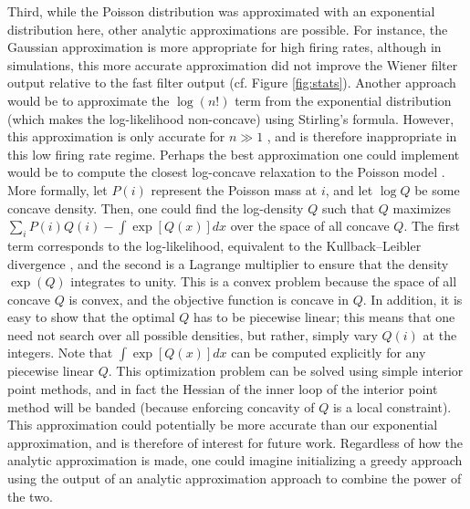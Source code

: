 Third, while the Poisson distribution was approximated with an exponential distribution here, other analytic approximations are possible. For instance, the Gaussian approximation is more appropriate for high firing rates, although in simulations, this more accurate approximation did not improve the Wiener filter output relative to the fast filter output (cf. Figure \ref{fig:stats}).  Another approach would be to approximate the $\log (n!)$  term from the exponential distribution (which makes the log-likelihood non-concave) using Stirling's formula. However, this approximation is only accurate for $n\gg 1$ \cite{AbramowitzStegun64}, and is therefore inappropriate in this low firing rate regime.  Perhaps the best approximation one could implement would be to compute the closest log-concave relaxation to the Poisson model \cite{KoenkerMizera10}. More formally, let $P(i)$ represent the Poisson mass at $i$, and let $\log Q$ be some concave density.  Then, one could find the log-density $Q$ such that $Q$ maximizes $\sum_i P(i) Q(i) - \int \exp[Q(x)] dx$ over the space of all concave $Q$. The first term corresponds to the log-likelihood, equivalent to the Kullback–Leibler divergence \cite{CoverThomas91}, and the second is a Lagrange multiplier to ensure that the density $\exp(Q)$ integrates to unity. This is a convex problem because the space of all concave $Q$ is convex, and the objective function is concave in $Q$. In addition, it is easy to show that the optimal $Q$ has to be piecewise linear; this means that one need not search over all possible densities, but rather, simply vary $Q(i)$ at the integers. Note that $\int \exp[Q(x)] dx$ can be computed explicitly for any piecewise linear $Q$. This optimization problem can be solved using simple interior point methods, and in fact the Hessian of the inner loop of the interior point method will be banded (because enforcing concavity of $Q$ is a local constraint). This approximation could potentially be more accurate than our exponential approximation, and is therefore of interest for future work. Regardless of how the analytic approximation is made, one could imagine initializing a greedy approach using the output of an analytic approximation approach to combine the power of the two.  

